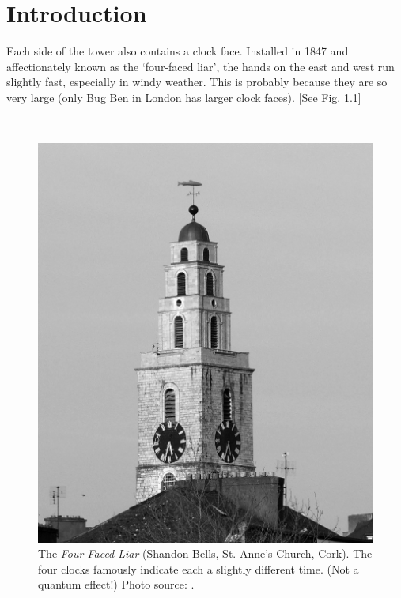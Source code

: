 \chapter{Introduction}\label{ch:intro}
\epigraph{\onehalfspacing
  Each side of the tower also contains a clock face. Installed in 1847 and affectionately known as the
  `four-faced liar', the hands on the east and west run slightly fast, especially in windy weather.
  This is probably because they are so very large
  (only Bug Ben in London has larger clock faces).
  [See Fig. \ref{fig:ShandonBells}]
}{\singlespacing
  \cite{CorkStrolls}\\
}
\begin{figure}[p]
  \centering
  \includegraphics[height=.6\textheight]{img/Shandon_bells_cork.BW.jpg}
  \caption[
    The \emph{Four Faced Liar} -- Shandon Bells, Cork
  ]{
    The \emph{Four Faced Liar}
    (Shandon Bells, St. Anne's Church, Cork).
    The four clocks 
    famously
    indicate each a slightly different time.
    (Not a quantum effect!)
    Photo source: \cite{ShandonBells}.
  }
  \label{fig:ShandonBells}
\end{figure}



